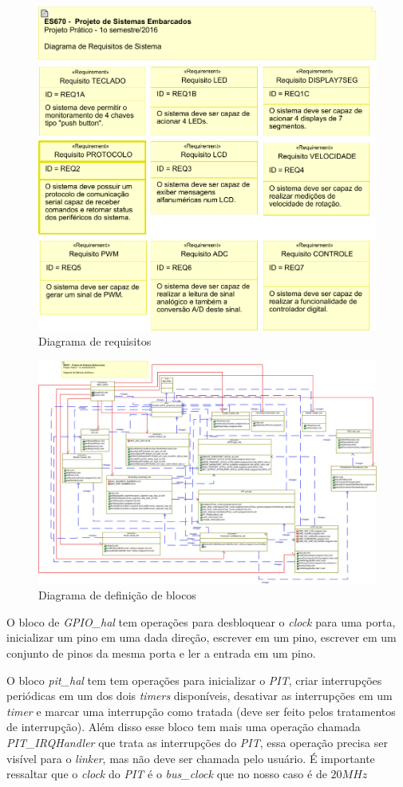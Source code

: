 \documentclass{article}
\begin{document}
\begin{figure}[H]
	\centering
	\includegraphics[width=0.9\linewidth]{requisitos}
	\caption{Diagrama de requisitos}
	\label{fig:requisitos}
\end{figure}
\begin{figure}[H]
	\centering
	\includegraphics[width=0.9\linewidth]{blocos}
	\caption{Diagrama de definição de blocos}
	\label{fig:blocos}
\end{figure}

O bloco de \textit{GPIO\_hal} tem operações para desbloquear o \textit{clock} para uma porta, inicializar um pino em uma dada direção, escrever em um pino, escrever em um conjunto de pinos da mesma porta e ler a entrada em um pino.

O bloco \textit{pit\_hal} tem tem operações para inicializar o \textit{PIT}, criar interrupções periódicas em um dos dois \textit{timers} disponíveis, desativar as interrupções em um \textit{timer} e marcar uma interrupção como tratada (deve ser feito pelos tratamentos de interrupção). Além disso esse bloco tem mais uma operação chamada \textit{PIT\_IRQHandler }que trata as interrupções do \textit{PIT}, essa operação precisa ser visível para o \textit{linker}, mas não deve ser chamada pelo usuário. É importante ressaltar que o \textit{clock} do \textit{PIT} é o \textit{bus\_clock} que no nosso caso é de $20MHz$
\end{document}
